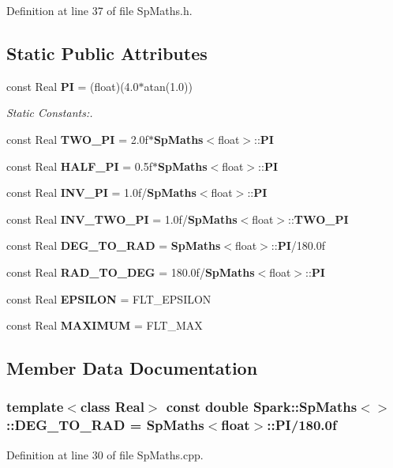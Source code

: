 Definition at line 37 of file Sp\-Maths.h.\subsection*{Static Public Attributes}
\begin{CompactItemize}
\item 
const Real {\bf PI} = (float)(4.0$\ast$atan(1.0))
\begin{CompactList}\small\item\em Static Constants:. \item\end{CompactList}\item 
const Real {\bf TWO\_\-PI} = 2.0f$\ast${\bf Sp\-Maths}$<$float$>$::{\bf PI}
\item 
const Real {\bf HALF\_\-PI} = 0.5f$\ast${\bf Sp\-Maths}$<$float$>$::{\bf PI}
\item 
const Real {\bf INV\_\-PI} = 1.0f/{\bf Sp\-Maths}$<$float$>$::{\bf PI}
\item 
const Real {\bf INV\_\-TWO\_\-PI} = 1.0f/{\bf Sp\-Maths}$<$float$>$::{\bf TWO\_\-PI}
\item 
const Real {\bf DEG\_\-TO\_\-RAD} = {\bf Sp\-Maths}$<$float$>$::{\bf PI}/180.0f
\item 
const Real {\bf RAD\_\-TO\_\-DEG} = 180.0f/{\bf Sp\-Maths}$<$float$>$::{\bf PI}
\item 
const Real {\bf EPSILON} = FLT\_\-EPSILON
\item 
const Real {\bf MAXIMUM} = FLT\_\-MAX
\end{CompactItemize}


\subsection{Member Data Documentation}
\subsubsection{\setlength{\rightskip}{0pt plus 5cm}template$<$class Real$>$ const double {\bf Spark::Sp\-Maths}$<$$>$::{\bf DEG\_\-TO\_\-RAD} = {\bf Sp\-Maths}$<$float$>$::{\bf PI}/180.0f\hspace{0.3cm}{\tt  [static]}}\label{classSpark_1_1SpMaths_s5}


Definition at line 30 of file Sp\-Maths.cpp.
